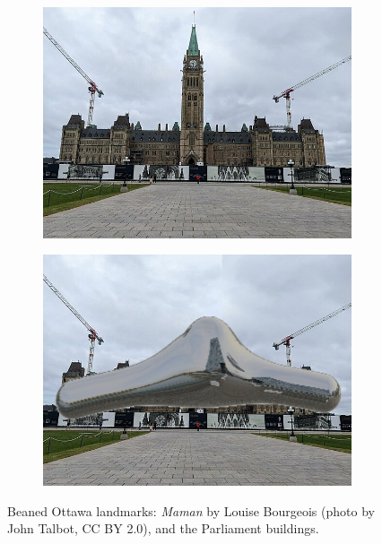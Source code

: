 \documentclass[%
reprint,
twocolumn,
nofootinbib,
 amsmath,amssymb,
 aps,
]{revtex4-2}
\begin{document}
\begin{figure}[H]
\begin{subfigure}{0.23\textwidth}
    \end{subfigure}
    \\
    \begin{subfigure}{0.23\textwidth}
        \includegraphics[width=0.98\linewidth]{img/Parliament_of_Canada_Building.jpg}
    \end{subfigure}
    \begin{subfigure}{0.23\textwidth}
        \includegraphics[width=0.98\linewidth]{img/parliament-bean-replacement.jpg}
    \end{subfigure}
    \caption{Beaned Ottawa landmarks: \emph{Maman} by Louise Bourgeois (photo by John Talbot, CC BY 2.0), and the Parliament buildings.}
    \label{fig:ottawa}
\end{figure}
\end{document}

